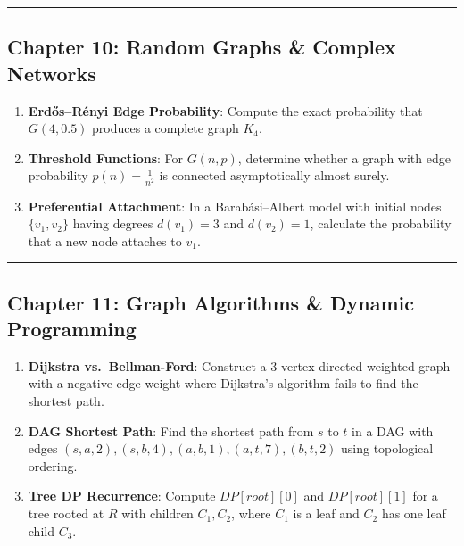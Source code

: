 \documentclass[
]{book}
\providecommand{\tightlist}{%
  \setlength{\itemsep}{0pt}\setlength{\parskip}{0pt}}
\theoremstyle{definition}
\theoremstyle{definition}
\theoremstyle{definition}
\theoremstyle{definition}
\theoremstyle{remark}
\begin{document}
\begin{center}\rule{0.5\linewidth}{0.5pt}\end{center}

\subsection{Chapter 10: Random Graphs \& Complex Networks}\label{chapter-10-random-graphs-complex-networks-1}

\begin{enumerate}
\def\labelenumi{\arabic{enumi}.}
\tightlist
\item
  \textbf{Erdős--Rényi Edge Probability}: Compute the exact probability that \(G(4, 0.5)\) produces a complete graph \(K_4\).
\item
  \textbf{Threshold Functions}: For \(G(n, p)\), determine whether a graph with edge probability \(p(n) = \frac{1}{n^2}\) is connected asymptotically almost surely.
\item
  \textbf{Preferential Attachment}: In a Barabási--Albert model with initial nodes \(\{v_1, v_2\}\) having degrees \(d(v_1) = 3\) and \(d(v_2) = 1\), calculate the probability that a new node attaches to \(v_1\).
\end{enumerate}

\begin{center}\rule{0.5\linewidth}{0.5pt}\end{center}

\subsection{Chapter 11: Graph Algorithms \& Dynamic Programming}\label{chapter-11-graph-algorithms-dynamic-programming-1}

\begin{enumerate}
\def\labelenumi{\arabic{enumi}.}
\tightlist
\item
  \textbf{Dijkstra vs.~Bellman-Ford}: Construct a 3-vertex directed weighted graph with a negative edge weight where Dijkstra's algorithm fails to find the shortest path.
\item
  \textbf{DAG Shortest Path}: Find the shortest path from \(s\) to \(t\) in a DAG with edges \((s, a, 2), (s, b, 4), (a, b, 1), (a, t, 7), (b, t, 2)\) using topological ordering.
\item
  \textbf{Tree DP Recurrence}: Compute \(DP[root][0]\) and \(DP[root][1]\) for a tree rooted at \(R\) with children \(C_1, C_2\), where \(C_1\) is a leaf and \(C_2\) has one leaf child \(C_3\).
\end{enumerate}
\end{document}
